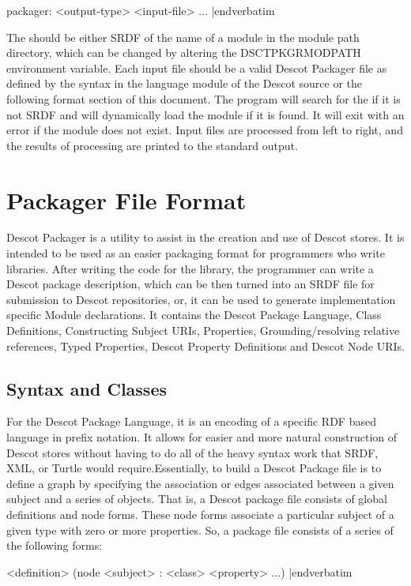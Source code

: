 \medskip\verbatim
packager: <output-type> <input-file> ...
|endverbatim
\medskip

\noindent
The {\tt <output-type>} should be either SRDF of the name of a module
in the module path directory, which can be changed by altering the
DSCTPKGRMODPATH environment variable. Each input file should be a
valid Descot Packager file as defined by the syntax in the language
module of the Descot source or the following format section of this
document. 
The program will search for the {\tt <output-type>} if it is not SRDF
and will dynamically load the module if it is found. It will exit with
an error if the module does not exist. 
Input files are processed from left to right, and the results of
processing are printed to the standard output. 
 
\chapter{Packager File Format}{}%
Descot Packager is a utility to assist in the creation and use of Descot
stores. It is intended to be used as an easier packaging format for 
programmers who write libraries. After writing the code for the library,
the programmer can write a Descot package description, which can be 
then turned into an SRDF file for submission to Descot repositories, 
or, it can be used to generate implementation specific Module declarations.
It contains the Descot Package Language, Class Definitions, Constructing 
Subject URIs, Properties, Grounding/resolving relative references, Typed 
Properties, Descot Property Definitions and Descot Node URIs.

\section{Syntax and Classes}{}%
For the Descot Package Language, it is an encoding of a specific RDF
based language in prefix notation. It allows for easier and more natural 
construction of Descot stores without having to do all of the heavy syntax 
work that SRDF, XML, or Turtle would require.Essentially, to build a Descot 
Package file is to define a graph by specifying the association or edges 
associated between a given subject and a series of objects. That is, a Descot 
package file consists of global definitions and node forms. These node forms 
associate a particular subject of a given type with zero or more properties. 
So, a package file consists of a series of the following forms:

\medskip\verbatim
<definition>
(node <subject> : <class> <property> ...)
|endverbatim
\medskip

